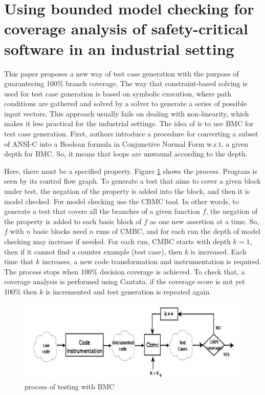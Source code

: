 \section{Using bounded model checking for coverage analysis of safety-critical software in an industrial setting \cite{angeletti2010}}

This paper proposes a new way of test case generation with the purpose of guaranteeing 100\% branch coverage. The way that constraint-based solving is used for test case generation
is based on symbolic execution, where path conditions are gathered and solved by a solver
to generate a series of possible input vectors. This approach usually fails on dealing with non-linearity, which makes it less practical for the industrial settings.
The idea of \cite{angeletti2010} is to use BMC for test case generation.
First, authors introduce a procedure for converting a subset of ANSI-C into a Boolean
formula in Conjunctive Normal Form w.r.t. a given depth for BMC. So, it means that loops are unwound according to the depth.

Here, there must be a specified property. Figure \ref{fig:testing-bmc} shows the process.
Program is seen by its control flow graph. To generate a test
that aims to cover a given block under test, the negation of the property
is added into the block, and then it is model checked. For model checking use the CBMC tool.
In other words, to generate a test that covers all the branches of a given function $f$,
the negation of the property is added to each basic block of $f$ as one new assertion at a time.
So, $f$ with $n$ basic blocks need $n$ runs of CMBC, and for each run the
depth of model checking may increase if needed. For each run, CMBC starts with depth $k = 1$,
then if it cannot find a counter example (test case), then $k$ is increased. Each time
that $k$ increases, a new code transformation and instrumentation is required.
The process stops when 100\% decision coverage is achieved.
To check that, a coverage analysis is performed using Cantata. if the
coverage score is not yet 100\% then $k$ is incremented
and test generation is repeated again.

\begin{figure}
  \centering
  \includegraphics[width=\textwidth]{p1.png}
  \caption{process of testing with BMC}\label{fig:testing-bmc}
\end{figure}

